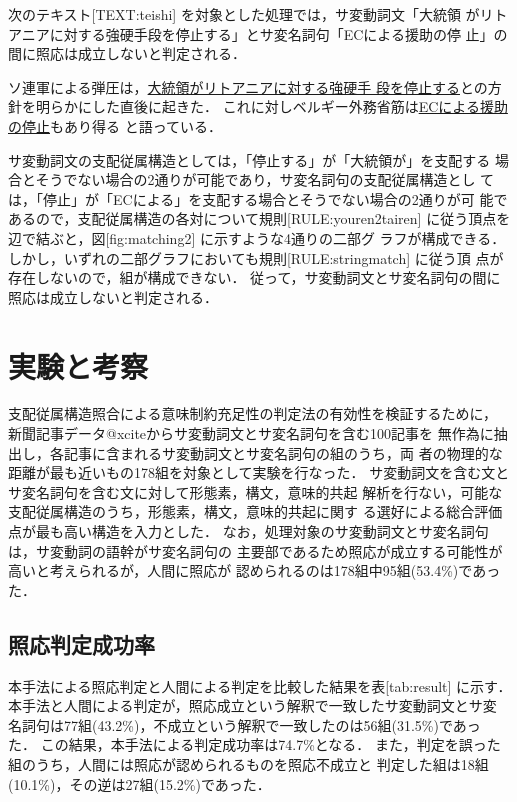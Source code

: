 次のテキスト[TEXT:teishi] を対象とした処理では，サ変動詞文「大統領
がリトアニアに対する強硬手段を停止する」とサ変名詞句「ECによる援助の停
止」の間に照応は成立しないと判定される．
\begin{TEXT}
\text ソ連軍による弾圧は，\underline{大統領がリトアニアに対する強硬手
段を停止する}との方針を明らかにした直後に起きた．
これに対しベルギー外務省筋は\underline{ECによる援助の停止}もあり得る
と語っている．\label{TEXT:teishi}
\end{TEXT}
サ変動詞文の支配従属構造としては，「停止する」が「大統領が」を支配する
場合とそうでない場合の2通りが可能であり，サ変名詞句の支配従属構造とし
ては，「停止」が「ECによる」を支配する場合とそうでない場合の2通りが可
能であるので，支配従属構造の各対について規則[RULE:youren2tairen]
に従う頂点を辺で結ぶと，図[fig:matching2] に示すような4通りの二部グ
ラフが構成できる．
しかし，いずれの二部グラフにおいても規則[RULE:stringmatch] に従う頂
点が存在しないので，組が構成できない． 
従って，サ変動詞文とサ変名詞句の間に照応は成立しないと判定される．


\section{実験と考察}
\label{sec:experiment}

支配従属構造照合による意味制約充足性の判定法の有効性を検証するために，
新聞記事データ@xciteからサ変動詞文とサ変名詞句を含む100記事を
無作為に抽出し，各記事に含まれるサ変動詞文とサ変名詞句の組のうち，両
者の物理的な距離が最も近いもの178組を対象として実験を行なった．
サ変動詞文を含む文とサ変名詞句を含む文に対して形態素，構文，意味的共起
解析を行ない，可能な支配従属構造のうち，形態素，構文，意味的共起に関す
る選好による総合評価点が最も高い構造を入力とした．
なお，処理対象のサ変動詞文とサ変名詞句は，サ変動詞の語幹がサ変名詞句の
主要部であるため照応が成立する可能性が高いと考えられるが，人間に照応が
認められるのは178組中95組(53.4\%)であった．

\subsection{照応判定成功率}

本手法による照応判定と人間による判定を比較した結果を表[tab:result]
に示す．
本手法と人間による判定が，照応成立という解釈で一致したサ変動詞文とサ変
名詞句は77組(43.2\%)，不成立という解釈で一致したのは56組(31.5\%)であっ
た． 
この結果，本手法による判定成功率は74.7\%となる．
また，判定を誤った組のうち，人間には照応が認められるものを照応不成立と
判定した組は18組(10.1\%)，その逆は27組(15.2\%)であった．



